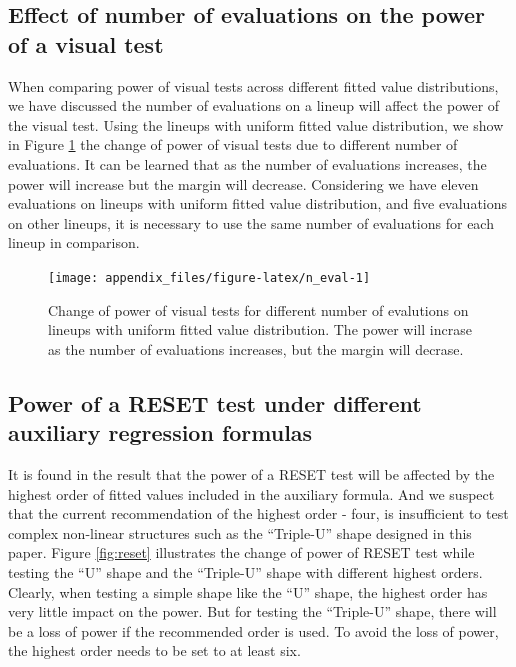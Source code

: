 \documentclass[]{interact}
\theoremstyle{plain}%
\theoremstyle{definition}
\theoremstyle{remark}
\begin{document}
\hypertarget{effect-of-number-of-evaluations-on-the-power-of-a-visual-test}{%
\subsection{Effect of number of evaluations on the power of a visual
test}\label{effect-of-number-of-evaluations-on-the-power-of-a-visual-test}}

When comparing power of visual tests across different fitted value
distributions, we have discussed the number of evaluations on a lineup
will affect the power of the visual test. Using the lineups with uniform
fitted value distribution, we show in Figure \ref{fig:n_eval} the change
of power of visual tests due to different number of evaluations. It can
be learned that as the number of evaluations increases, the power will
increase but the margin will decrease. Considering we have eleven
evaluations on lineups with uniform fitted value distribution, and five
evaluations on other lineups, it is necessary to use the same number of
evaluations for each lineup in comparison.

\begin{figure}

{\centering \texttt{[image: appendix\_files/figure-latex/n\_eval-1]} 

}

\caption{Change of power of visual tests for different number of evalutions on lineups with uniform fitted value distribution. The power will incrase as the number of evaluations increases, but the margin will decrase.}\label{fig:n_eval}
\end{figure}

\hypertarget{power-of-a-reset-test-under-different-auxiliary-regression-formulas}{%
\subsection{Power of a RESET test under different auxiliary regression
formulas}\label{power-of-a-reset-test-under-different-auxiliary-regression-formulas}}

It is found in the result that the power of a RESET test will be
affected by the highest order of fitted values included in the auxiliary
formula. And we suspect that the current recommendation of the highest
order - four, is insufficient to test complex non-linear structures such
as the ``Triple-U'' shape designed in this paper. Figure \ref{fig:reset}
illustrates the change of power of RESET test while testing the ``U''
shape and the ``Triple-U'' shape with different highest orders. Clearly,
when testing a simple shape like the ``U'' shape, the highest order has
very little impact on the power. But for testing the ``Triple-U'' shape,
there will be a loss of power if the recommended order is used. To avoid
the loss of power, the highest order needs to be set to at least six.
\end{document}
